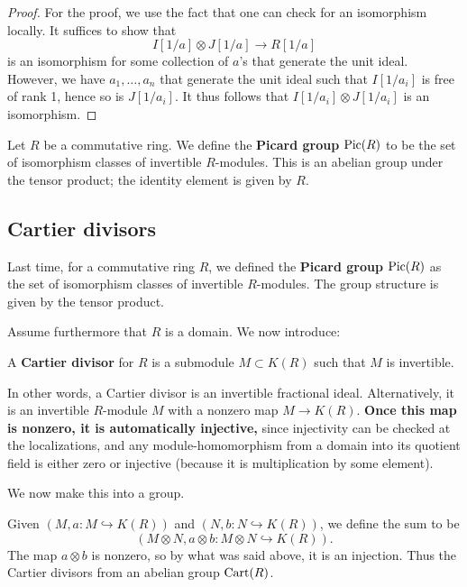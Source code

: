\begin{proof}
For the proof, we use the fact that one can check for an isomorphism locally.  
It suffices to show that 
\[ I[1/a] \otimes J[1/a] \to R[1/a]  \]
is an isomorphism for some collection of $a$'s that generate the unit ideal.
However, we have $a_1, \dots, a_n$ that generate the unit ideal such that
$I[1/a_i]$ is free of rank 1, hence so is $J[1/a_i]$. It thus follows that
$I[1/a_i] \otimes J[1/a_i]$ is an isomorphism.
\end{proof} 


\begin{definition} 
Let $R$ be a commutative ring. We define the \textbf{Picard group} $\operatorname{Pic}(R)$ to
be the set of isomorphism classes of invertible $R$-modules. This is an abelian group
under the tensor product; the identity element is given by $R$. 
\end{definition} 


\subsection{Cartier divisors}
Last time, for a commutative ring $R$, we defined the \textbf{Picard group}
$\operatorname{Pic}(R)$ as the set of isomorphism classes of invertible $R$-modules. The
group structure is given by the tensor product.


Assume furthermore that $R$ is a domain. We now introduce:

\begin{definition} 
A \textbf{Cartier divisor} for $R$ is a submodule $M \subset K(R)$ such that
$M$ is invertible. 
\end{definition} 
In other words, a Cartier divisor is an invertible fractional ideal.
Alternatively, it is an invertible $R$-module $M$ with a nonzero map $M \to
K(R)$. \textbf{ Once this map is nonzero, it is automatically injective,} since
injectivity can be checked at the localizations, and any module-homomorphism from a domain into
its quotient field is either zero or injective (because it is multiplication by
some element). 


We now make this into a group. 
\begin{definition} 
Given $(M, a: M \hookrightarrow K(R))$ and $(N, b: N \hookrightarrow K(R))$, we
define the sum to be 
\[  (M \otimes N, a \otimes b: M \otimes N \hookrightarrow K(R)). \]
The map $a \otimes b$ is nonzero, so by what was said above, it is an injection.
Thus the Cartier divisors from an abelian group $\operatorname{Cart}(R)$.
\end{definition} 

